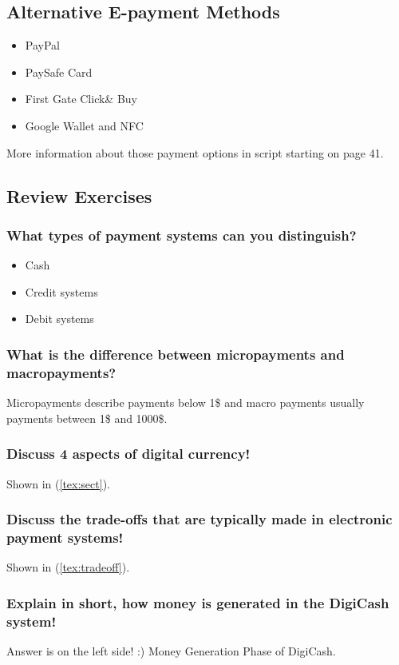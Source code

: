 \documentclass[a4paper, 10 pt, conference]{ieeeconf}
\begin{document}
\subsection{\textbf{Alternative E-payment Methods}}
\begin{itemize}
\item PayPal
\item PaySafe Card
\item First Gate Click\& Buy
\item Google Wallet and NFC
\end{itemize}
More information about those payment options in script starting on page 41.


\subsection{\textbf{Review Exercises}}

\subsubsection{\textbf{What types of payment systems can you distinguish?}}
\begin{itemize}
\item Cash
\item Credit systems
\item Debit systems
\end{itemize}

\subsubsection{\textbf{What is the difference between micropayments and macropayments?}}
Micropayments describe payments below 1\$ and macro payments usually payments between 1\$ and 1000\$. 
\subsubsection{\textbf{Discuss 4 aspects of digital currency!}}
Shown in (\ref{tex:sect}).
\subsubsection{\textbf{Discuss the trade-offs that are typically made in electronic payment systems!}}
Shown in (\ref{tex:tradeoff}).
\subsubsection{\textbf{Explain in short, how money is generated in the DigiCash system!}}
Answer is on the left side! :) Money Generation Phase of DigiCash. 
\end{document}
